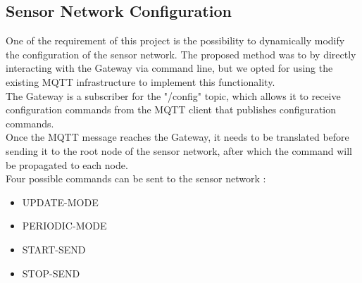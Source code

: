 \documentclass[a4paper,11pt]{article}
\begin{document}
\subsection{Sensor Network Configuration}
One of the requirement of this project is the possibility to dynamically modify the configuration of the sensor network. The proposed method was to by directly interacting with the Gateway via command line, but we opted for using the existing MQTT infrastructure to implement this functionality.\\

The Gateway is a subscriber for the "/config" topic, which allows it to receive configuration commands from the MQTT client that publishes configuration commands.\\

Once the MQTT message reaches the Gateway, it needs to be translated before sending it to the root node of the sensor network, after which the command will be propagated to each node.\\

Four possible commands can be sent to the sensor network :
\begin{itemize}
\item{UPDATE-MODE}
\item{PERIODIC-MODE}
\item{START-SEND}
\item{STOP-SEND}
\end{itemize}
\end{document}
